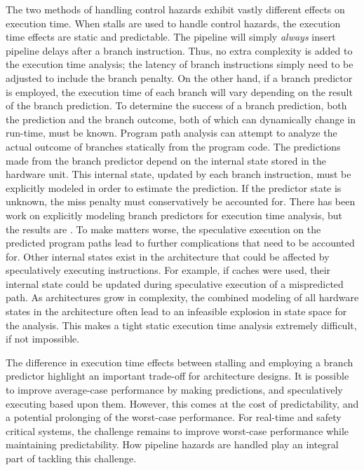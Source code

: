 The two methods of handling control hazards exhibit vastly different effects on execution time.    
When stalls are used to handle control hazards, the execution time effects are static and predictable.   
The pipeline will simply \emph{always} insert pipeline delays after a branch instruction.
Thus, no extra complexity is added to the execution time analysis; the latency of branch instructions simply need to be adjusted to include the branch penalty.
On the other hand, if a branch predictor is employed, the execution time of each branch will vary depending on the result of the branch prediction.  
To determine the success of a branch prediction, both the prediction and the branch outcome, both of which can dynamically change in run-time, must be known.   
Program path analysis can attempt to analyze the actual outcome of branches statically from the program code. 
The predictions made from the branch predictor depend on the internal state stored in the hardware unit.
This internal state, updated by each branch instruction, must be explicitly modeled in order to estimate the prediction. 
If the predictor state is unknown, the miss penalty must conservatively be accounted for.
There has been work on explicitly modeling branch predictors for execution time analysis, but the results are .
To make matters worse, the speculative execution on the predicted program paths lead to further complications that need to be accounted for.
Other internal states exist in the architecture that could be affected by speculatively executing instructions.
For example, if caches were used, their internal state could be updated during speculative execution of a mispredicted path.
As architectures grow in complexity, the combined modeling of all hardware states in the architecture often lead to an infeasible explosion in state space for the analysis.    
This makes a tight static execution time analysis extremely difficult, if not impossible.

The difference in execution time effects between stalling and employing a branch predictor highlight an important trade-off for architecture designs.    
It is possible to improve average-case performance by making predictions, and speculatively executing based upon them.
However, this comes at the cost of predictability, and a potential prolonging of the worst-case performance.  
For real-time and safety critical systems, the challenge remains to improve worst-case performance while maintaining predictability.
How pipeline hazards are handled play an integral part of tackling this challenge.           
 
